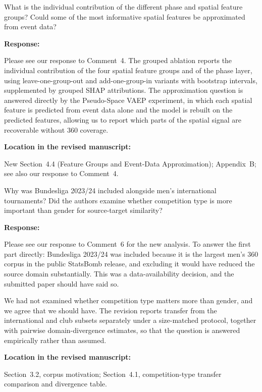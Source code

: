 \documentclass[11pt,a4paper]{article}
\newcommand{\pending}[1]{\textcolor{statuspending}{#1}}
\newcommand{\newwork}[1]{\textcolor{statusnew}{#1}}
\newcommand{\response}[2]{%
  \begin{responsebox}
  \textbf{Response:}

  #1
  \end{responsebox}
  \begin{locationbox}
  \textbf{Location in the revised manuscript:}

  #2
  \end{locationbox}
}
\begin{document}
\begin{reviewbox}[Question 4]
What is the individual contribution of the different phase and spatial feature groups? Could some of the most informative spatial features be approximated from event data?
\end{reviewbox}
\response{\newwork{Please see our response to Comment~4. The grouped ablation reports the individual contribution of the four spatial feature groups and of the phase layer, using leave-one-group-out and add-one-group-in variants with bootstrap intervals, supplemented by grouped SHAP attributions. The approximation question is answered directly by the Pseudo-Space VAEP experiment, in which each spatial feature is predicted from event data alone and the model is rebuilt on the predicted features, allowing us to report which parts of the spatial signal are recoverable without 360 coverage.}}{New Section~4.4 (Feature Groups and Event-Data Approximation); Appendix~B; see also our response to Comment~4.}

\begin{reviewbox}[Question 5]
Why was Bundesliga 2023/24 included alongside men's international tournaments? Did the authors examine whether competition type is more important than gender for source-target similarity?
\end{reviewbox}
\response{Please see our response to Comment~6 for the new analysis. To answer the first part directly: Bundesliga 2023/24 was included because it is the largest men's 360 corpus in the public StatsBomb release, and excluding it would have reduced the source domain substantially. This was a data-availability decision, and the submitted paper should have said so.

\pending{We had not examined whether competition type matters more than gender, and we agree that we should have. The revision reports transfer from the international and club subsets separately under a size-matched protocol, together with pairwise domain-divergence estimates, so that the question is answered empirically rather than assumed.}}{Section~3.2, corpus motivation; Section~4.1, competition-type transfer comparison and divergence table.}
\end{document}
